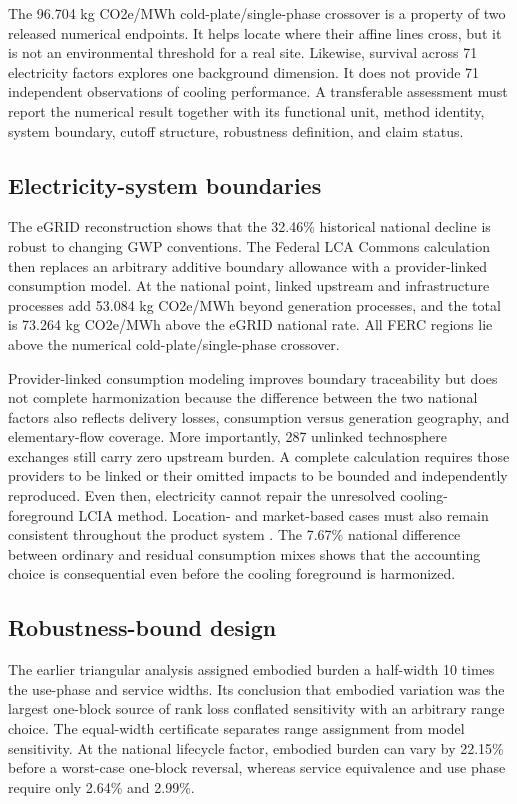 \documentclass[review,12pt]{elsarticle}
\begin{document}
The 96.704 kg CO2e/MWh cold-plate/single-phase crossover is a property of two released numerical endpoints. It helps locate where their affine lines cross, but it is not an environmental threshold for a real site. Likewise, survival across 71 electricity factors explores one background dimension. It does not provide 71 independent observations of cooling performance. A transferable assessment must report the numerical result together with its functional unit, method identity, system boundary, cutoff structure, robustness definition, and claim status.

\subsection{Electricity-system boundaries}
The eGRID reconstruction shows that the 32.46\% historical national decline is robust to changing GWP conventions. The Federal LCA Commons calculation then replaces an arbitrary additive boundary allowance with a provider-linked consumption model. At the national point, linked upstream and infrastructure processes add 53.084 kg CO2e/MWh beyond generation processes, and the total is 73.264 kg CO2e/MWh above the eGRID national rate. All FERC regions lie above the numerical cold-plate/single-phase crossover.

Provider-linked consumption modeling improves boundary traceability but does not complete harmonization because the difference between the two national factors also reflects delivery losses, consumption versus generation geography, and elementary-flow coverage. More importantly, 287 unlinked technosphere exchanges still carry zero upstream burden. A complete calculation requires those providers to be linked or their omitted impacts to be bounded and independently reproduced. Even then, electricity cannot repair the unresolved cooling-foreground LCIA method. Location- and market-based cases must also remain consistent throughout the product system \cite{ref22,ref23}. The 7.67\% national difference between ordinary and residual consumption mixes shows that the accounting choice is consequential even before the cooling foreground is harmonized.

\subsection{Robustness-bound design}
The earlier triangular analysis assigned embodied burden a half-width 10 times the use-phase and service widths. Its conclusion that embodied variation was the largest one-block source of rank loss conflated sensitivity with an arbitrary range choice. The equal-width certificate separates range assignment from model sensitivity. At the national lifecycle factor, embodied burden can vary by 22.15\% before a worst-case one-block reversal, whereas service equivalence and use phase require only 2.64\% and 2.99\%.
\end{document}
